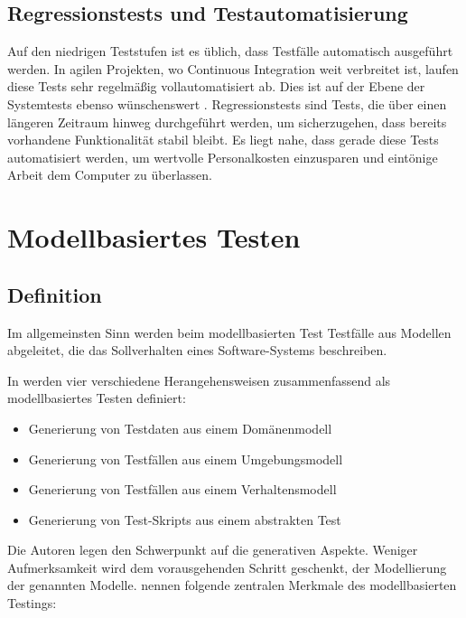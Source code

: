 \subsection{Regressionstests und Testautomatisierung}
\label{sec:regressionstests}
Auf den niedrigen Teststufen ist es üblich, dass Testfälle automatisch ausgeführt werden. In agilen Projekten, wo Continuous Integration weit verbreitet ist, laufen diese Tests sehr regelmäßig vollautomatisiert ab. Dies ist auf der Ebene der Systemtests ebenso wünschenswert \cite{linz_testing_2014}. Regressionstests sind Tests, die über einen längeren Zeitraum hinweg durchgeführt werden, um sicherzugehen, dass bereits vorhandene Funktionalität stabil bleibt. Es liegt nahe, dass gerade diese Tests automatisiert werden, um wertvolle Personalkosten einzusparen und eintönige Arbeit dem Computer zu überlassen.

\section{Modellbasiertes Testen}
\label{sec:mbt}
\subsection{Definition}
Im allgemeinsten Sinn werden beim modellbasierten Test Testfälle aus Modellen abgeleitet, die das Sollverhalten eines Software-Systems beschreiben.

In  \cite{utting_practical_2007} werden vier verschiedene Herangehensweisen zusammenfassend als modellbasiertes Testen definiert:

\begin{itemize}
\item Generierung von Testdaten aus einem Domänenmodell
\item Generierung von Testfällen aus einem Umgebungsmodell
\item Generierung von Testfällen aus einem Verhaltensmodell
\item Generierung von Test-Skripts aus einem abstrakten Test
\end{itemize}

Die Autoren legen den Schwerpunkt auf die generativen Aspekte. Weniger Aufmerksamkeit wird dem vorausgehenden Schritt geschenkt, der Modellierung der genannten Modelle. \citeauthor{rossner_basiswissen_2010} \cite{rossner_basiswissen_2010} nennen folgende zentralen Merkmale des modellbasierten Testings:


